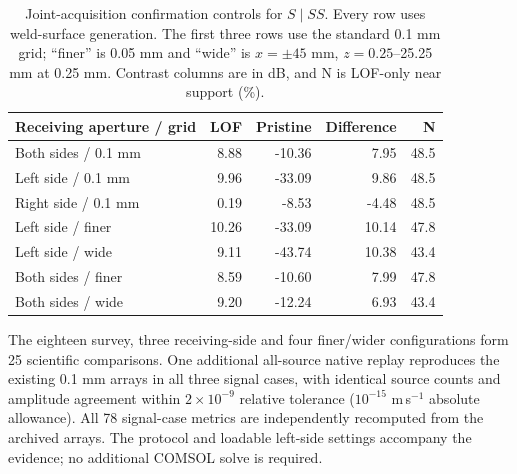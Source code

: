\documentclass[11pt]{article}
\begin{document}
\begin{table}[htbp]\centering\small
\caption{Joint-acquisition confirmation controls for $S\mid SS$. Every row uses weld-surface generation. The first three rows use the standard 0.1 mm grid; ``finer'' is 0.05 mm and ``wide'' is $x=\pm45$ mm, $z=0.25$--25.25 mm at 0.25 mm. Contrast columns are in dB, and N is LOF-only near support (\%).}
\label{saft:archive:partial:joint_controls}
\begin{tabularx}{\linewidth}{@{}Xrrrr@{}}\toprule
Receiving aperture / grid & LOF & Pristine & Difference & N\\\midrule
Both sides / 0.1 mm & 8.88 & -10.36 & 7.95 & 48.5 \\
Left side / 0.1 mm & 9.96 & -33.09 & 9.86 & 48.5 \\
Right side / 0.1 mm & 0.19 & -8.53 & -4.48 & 48.5 \\
Left side / finer & 10.26 & -33.09 & 10.14 & 47.8 \\
Left side / wide & 9.11 & -43.74 & 10.38 & 43.4 \\
Both sides / finer & 8.59 & -10.60 & 7.99 & 47.8 \\
Both sides / wide & 9.20 & -12.24 & 6.93 & 43.4 \\

\bottomrule\end{tabularx}
\end{table}

The eighteen survey, three receiving-side and four finer/wider configurations form 25 scientific comparisons. One additional all-source native replay reproduces the existing 0.1 mm arrays in all three signal cases, with identical source counts and amplitude agreement within $2\times10^{-9}$ relative tolerance ($10^{-15}$ m\,s$^{-1}$ absolute allowance). All 78 signal-case metrics are independently recomputed from the archived arrays. The protocol and loadable left-side settings accompany the evidence; no additional COMSOL solve is required.
\FloatBarrier
\end{document}
